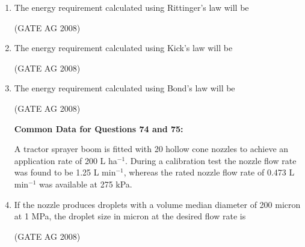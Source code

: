 \documentclass[journal]{IEEEtran}
\begin{document}
\begin{enumerate}
\item 
 The energy requirement calculated using Rittinger's law will be
\begin{enumerate}
\end{enumerate}
\hfill(GATE AG 2008)\\

\medskip

\item 
 The energy requirement calculated using Kick's law will be
\begin{enumerate}
\end{enumerate}
\hfill(GATE AG 2008)\\

\medskip

\item 
 The energy requirement calculated using Bond's law will be
\begin{enumerate}
\end{enumerate}
\hfill(GATE AG 2008)\\

\medskip


\textbf{Common Data for Questions 74 and 75:}

A tractor sprayer boom is fitted with 20 hollow cone nozzles to achieve an application rate of 200 L ha$^{-1}$. During a calibration test the nozzle flow rate was found to be 1.25 L min$^{-1}$, whereas the rated nozzle flow rate of 0.473 L min$^{-1}$ was available at 275 kPa.

\item 
 If the nozzle produces droplets with a volume median diameter of 200 micron at 1 MPa, the droplet size in micron at the desired flow rate is
\begin{enumerate}
\end{enumerate}
\hfill(GATE AG 2008)\\


\end{enumerate}
\end{document}
